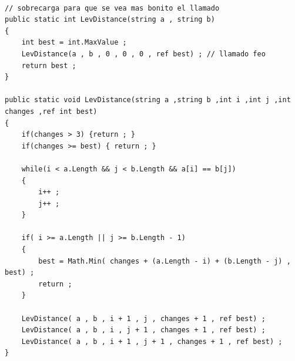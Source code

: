 \documentclass{article}
\begin{document}
\begin{lstlisting}

// sobrecarga para que se vea mas bonito el llamado
public static int LevDistance(string a , string b) 
{
    int best = int.MaxValue ;
    LevDistance(a , b , 0 , 0 , 0 , ref best) ; // llamado feo
    return best ;
}

public static void LevDistance(string a ,string b ,int i ,int j ,int changes ,ref int best)
{
    if(changes > 3) {return ; }
    if(changes >= best) { return ; }

    while(i < a.Length && j < b.Length && a[i] == b[j])
    {
        i++ ;
        j++ ;
    }
        
    if( i >= a.Length || j >= b.Length - 1)
    {
        best = Math.Min( changes + (a.Length - i) + (b.Length - j) , best) ;
        return ;
    }
    
    LevDistance( a , b , i + 1 , j , changes + 1 , ref best) ;
    LevDistance( a , b , i , j + 1 , changes + 1 , ref best) ;
    LevDistance( a , b , i + 1 , j + 1 , changes + 1 , ref best) ;
}           
\end{lstlisting}
\end{document}
